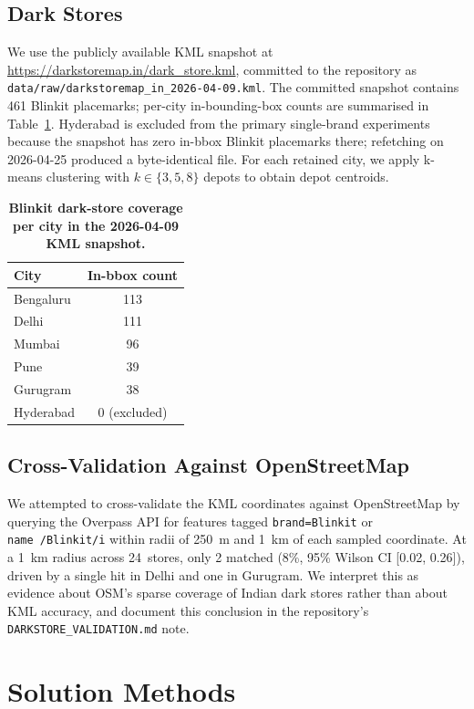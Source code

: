 \documentclass{ieeeaccess}
\begin{document}
\subsection{Dark Stores}
We use the publicly available KML snapshot at
\url{https://darkstoremap.in/dark_store.kml}, committed to the
repository as
\texttt{data/raw/darkstoremap\_in\_2026-04-09.kml}. The committed
snapshot contains 461 Blinkit placemarks; per-city
in-bounding-box counts are summarised in
Table~\ref{tab:darkstore-counts}. Hyderabad is excluded from the
primary single-brand experiments because the snapshot has zero in-bbox
Blinkit placemarks there; refetching on 2026-04-25 produced a
byte-identical file. For each retained city, we apply k-means
clustering with $k \in \{3, 5, 8\}$ depots to obtain depot centroids.

\begin{table}
\caption{\textbf{Blinkit dark-store coverage per city in the
2026-04-09 KML snapshot.}}
\label{tab:darkstore-counts}
\centering
\begin{tabular}{lc}
\toprule
City & In-bbox count \\
\midrule
Bengaluru & 113 \\
Delhi & 111 \\
Mumbai & 96 \\
Pune & 39 \\
Gurugram & 38 \\
Hyderabad & 0 (excluded) \\
\bottomrule
\end{tabular}
\end{table}

\subsection{Cross-Validation Against OpenStreetMap}
We attempted to cross-validate the KML coordinates against
OpenStreetMap by querying the Overpass API for features tagged
\texttt{brand=Blinkit} or \texttt{name~/Blinkit/i} within radii of
250~m and 1~km of each sampled coordinate. At a 1~km radius across
24~stores, only 2 matched (8\%, 95\% Wilson CI [0.02, 0.26]), driven
by a single hit in Delhi and one in Gurugram. We interpret this as
evidence about OSM's sparse coverage of Indian dark stores rather
than about KML accuracy, and document this conclusion in the
repository's \texttt{DARKSTORE\_VALIDATION.md} note.

\section{Solution Methods}
\label{sec:methods}
\end{document}
